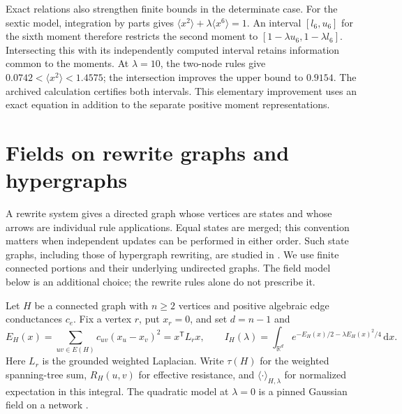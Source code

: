 \documentclass[11pt]{article}
\theoremstyle{definition}
\newcommand{\dd}{\,\mathrm d}
\numberwithin{equation}{section}
\begin{document}
Exact relations also strengthen finite bounds in the determinate case.
For the sextic model, integration by parts gives
$\langle x^2\rangle+\lambda\langle x^6\rangle=1$.
An interval $[l_6,u_6]$ for the sixth moment therefore restricts the
second moment to $[1-\lambda u_6,1-\lambda l_6]$.
Intersecting this with its independently computed interval retains
information common to the moments. At $\lambda=10$, the two-node rules
give $0.0742<\langle x^2\rangle<1.4575$; the intersection improves the
upper bound to $0.9154$. The archived calculation certifies both
intervals. This elementary improvement uses an exact equation in addition
to the separate positive moment representations.

\section{Fields on rewrite graphs and hypergraphs}\label{sec:rewrite}
A rewrite system gives a directed graph whose vertices are states and
whose arrows are individual rule applications. Equal states are merged;
this convention matters when independent updates can be performed in
either order. Such state graphs, including those of hypergraph rewriting,
are studied in \cite[Sections 5.3 and 6.2]{Wolfram}. We use finite connected
portions and their underlying undirected graphs. The field model below
is an additional choice; the rewrite rules alone do not prescribe it.

Let $H$ be a connected graph with $n\ge2$ vertices and positive algebraic edge
conductances $c_e$. Fix a vertex $r$, put $x_r=0$, and set $d=n-1$ and
\[
 E_H(x)=\sum_{uv\in E(H)}c_{uv}(x_u-x_v)^2=x^{\mathsf T}L_rx,
 \qquad
 I_H(\lambda)=\int_{\mathbb R^d}
 e^{-E_H(x)/2-\lambda E_H(x)^2/4}\dd x.
\]
Here $L_r$ is the grounded weighted Laplacian. Write $\tau(H)$ for the
weighted spanning-tree sum, $R_H(u,v)$ for effective resistance, and
$\langle\cdot\rangle_{H,\lambda}$ for normalized expectation in this
integral. The quadratic model at $\lambda=0$ is a pinned Gaussian
field on a network \cite{LyonsPeres}.
\end{document}
